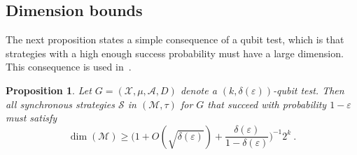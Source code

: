\documentclass[11pt]{article}
\newtheorem{proposition}[theorem]{Proposition}
\theoremstyle{definition}
\newcommand{\strategy}{\mathscr{S}}
\newcommand{\mA}{\ensuremath{\mathcal{A}}}
\newcommand{\mM}{\ensuremath{\mathcal{M}}}
\newcommand{\mX}{\ensuremath{\mathcal{X}}}
\newcommand{\eps}{\varepsilon}
\begin{document}
\subsection{Dimension bounds}



The next proposition states a simple consequence of a qubit test, which is that strategies with a high enough success probability must have a large dimension. This consequence is used in~\cite{ji2020mip}. 

\begin{proposition}
\label{prop:dim-test}
Let $G = (\mX,\mu,\mA,D)$ denote a $(k,\delta(\eps))$-qubit test. Then all synchronous strategies $\strategy$ in $(\mM,\tau)$ for $G$ that succeed with probability $1 - \eps$ must satisfy 
\[
\dim(\mM) \geq \Big( 1 + O(\sqrt{\delta(\eps)}) + \frac{\delta(\eps)}{1 - \delta(\eps)}\Big)^{-1} 2^k~.
\]
\end{proposition}
\end{document}
